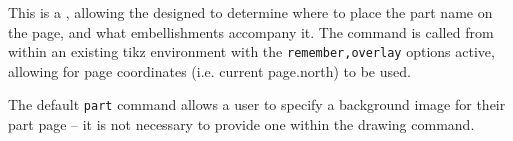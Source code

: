 \begin{macrolist}
				{
				}
				{
					This is a \placeholderCommand{}, allowing the designed to determine where to place the part name on the page, and what embellishments accompany it. The command is called from within an existing tikz environment with the \verb|remember,overlay| options active, allowing for page coordinates (i.e. current page.north) to be used.

					The default \verb|part| command allows a user to specify a background image for their part page -- it is not necessary to provide one within the drawing command.
				}
			
		\end{macrolist}
	
